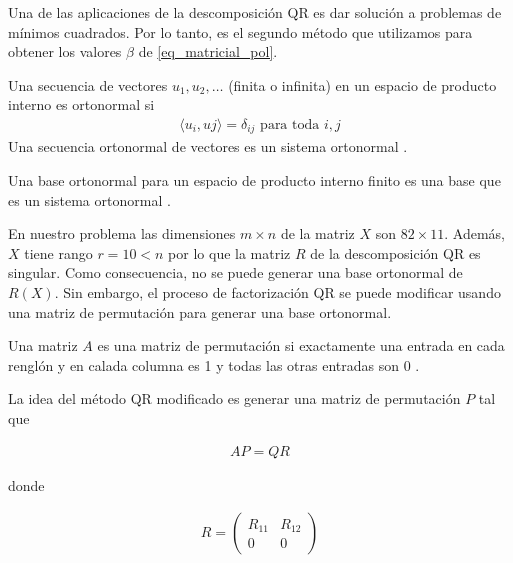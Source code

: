 Una de las aplicaciones de la descomposición QR es dar solución a problemas de mínimos cuadrados. Por lo tanto, es el segundo método que utilizamos para obtener los valores $\beta$ de \ref{eq_matricial_pol}.

 \begin{definition}
 Una secuencia de vectores $u_1, u_2, \dots$ (finita o infinita) en un espacio de producto interno es ortonormal si 
 \begin{equation*}
     \begin{aligned}
     \langle u_i , uj \rangle = \delta_{ij} \text{ para toda $i, j$}
     \end{aligned}
 \end{equation*}
 Una secuencia ortonormal de vectores es un sistema ortonormal \cite[p.~147]{garcia2017second}.
 \end{definition}

\begin{definition}
Una base ortonormal para un espacio de producto interno finito es una base que es un sistema ortonormal \cite[p.~149]{garcia2017second}.
\end{definition}

En nuestro problema las dimensiones $m \times n$ de la matriz $X$ son $82 \times 11$. Además, $X$ tiene rango $r = 10 < n$ por lo que la matriz $R$ de la descomposición QR es singular. Como consecuencia, no se puede generar una base ortonormal de $R(X)$. Sin embargo, el proceso de factorización QR se puede modificar usando una matriz de permutación para generar una base ortonormal.


\begin{definition}
Una matriz $A$ es una matriz de permutación si exactamente una entrada en cada renglón y en calada columna es 1 y todas las otras entradas son 0 \cite[p.~183]{garcia2017second}.
\end{definition}

La idea del método QR modificado es generar una matriz de permutación $P$ tal que 

\begin{equation*}
    \begin{aligned}
    AP = QR
    \end{aligned}
\end{equation*}

donde 

\begin{equation*}
    \begin{aligned}
    R = 
    \begin{pmatrix}
    R_{11} & R_{12} \\
    0      & 0
    \end{pmatrix}
    \end{aligned}
\end{equation*}

